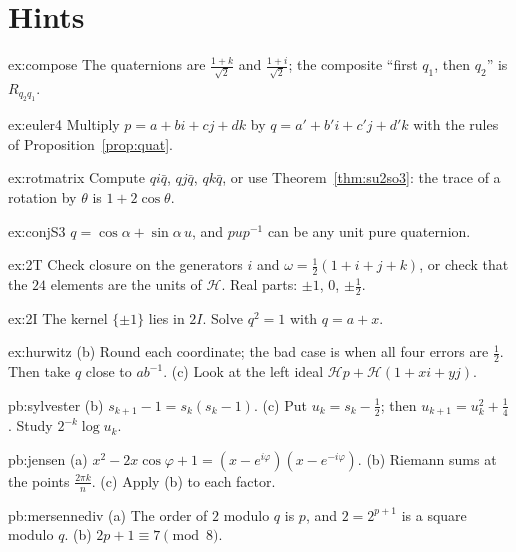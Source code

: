 \section{Hints}

\begin{hint}{ex:compose}
The quaternions are $\frac{1+k}{\sqrt2}$ and $\frac{1+i}{\sqrt2}$; the composite ``first $q_1$, then $q_2$'' is $R_{q_2q_1}$.
\end{hint}
\begin{hint}{ex:euler4}
Multiply $p=a+bi+cj+dk$ by $q=a'+b'i+c'j+d'k$ with the rules of Proposition~\ref{prop:quat}.
\end{hint}
\begin{hint}{ex:rotmatrix}
Compute $qi\bar q$, $qj\bar q$, $qk\bar q$, or use Theorem~\ref{thm:su2so3}: the trace of a rotation by $\theta$ is $1+2\cos\theta$.
\end{hint}
\begin{hint}{ex:conjS3}
$q=\cos\alpha+\sin\alpha\,u$, and $pup^{-1}$ can be any unit pure quaternion.
\end{hint}
\begin{hint}{ex:2T}
Check closure on the generators $i$ and $\omega=\frac12(1+i+j+k)$, or check that the $24$ elements are the units of $\mathcal H$. Real parts: $\pm1$, $0$, $\pm\frac12$.
\end{hint}
\begin{hint}{ex:2I}
The kernel $\{\pm1\}$ lies in $2I$. Solve $q^2=1$ with $q=a+x$.
\end{hint}
\begin{hint}{ex:hurwitz}
(b) Round each coordinate; the bad case is when all four errors are $\frac12$. Then take $q$ close to $ab^{-1}$. (c) Look at the left ideal $\mathcal Hp+\mathcal H(1+xi+yj)$.
\end{hint}

\begin{hint}{pb:sylvester}
(b) $s_{k+1}-1=s_k(s_k-1)$. (c) Put $u_k=s_k-\frac12$; then $u_{k+1}=u_k^2+\frac14$. Study $2^{-k}\log u_k$.
\end{hint}

\begin{hint}{pb:jensen}
(a) $x^2-2x\cos\varphi+1=(x-e^{i\varphi})(x-e^{-i\varphi})$. (b) Riemann sums at the points $\frac{2\pi k}n$. (c) Apply (b)
to each factor.
\end{hint}

\begin{hint}{pb:mersennediv}
(a) The order of $2$ modulo $q$ is $p$, and $2=2^{p+1}$ is a square modulo $q$. (b) $2p+1\equiv7\pmod8$.
\end{hint}

